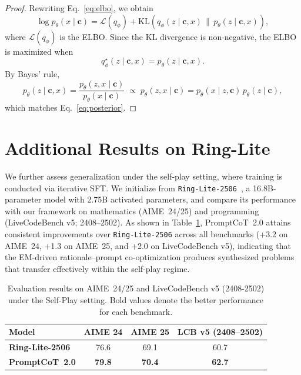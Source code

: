 \begin{proof}
Rewriting Eq.~\ref{eq:elbo}, we obtain
\[
\log p_\theta(x \mid \mathbf{c})
= \mathcal{L}(q_\phi) 
+ \mathrm{KL}\!\left(q_\phi(z \mid \mathbf{c}, x)\,\|\,p_\theta(z \mid \mathbf{c}, x)\right),
\]
where $\mathcal{L}(q_\phi)$ is the ELBO. Since the KL divergence is non-negative, the ELBO is maximized when
\[
q_\phi^\star(z \mid \mathbf{c}, x) = p_\theta(z \mid \mathbf{c}, x).
\]
By Bayes’ rule,
\[
p_\theta(z \mid \mathbf{c}, x) = \frac{p_\theta(z, x \mid \mathbf{c})}{p_\theta(x \mid \mathbf{c})}
\;\propto\; p_\theta(z, x \mid \mathbf{c})
= p_\theta(x \mid z, \mathbf{c}) \, p_\theta(z \mid \mathbf{c}),
\]
which matches Eq.~\ref{eq:posterior}.
\end{proof}


\section{Additional Results on Ring-Lite}
\label{sec:ringlite}

We further assess generalization under the self-play setting, where training is conducted via iterative SFT. We initialize from \texttt{Ring-Lite-2506}~\citep{team2025ring}, a 16.8B-parameter model with 2.75B activated parameters, and compare its performance with our framework on mathematics (AIME~24/25) and programming (LiveCodeBench v5; 2408–2502). As shown in Table~\ref{tab:ringlite}, PromptCoT~2.0 attains consistent improvements over \texttt{Ring-Lite-2506} across all benchmarks (+3.2 on AIME~24, +1.3 on AIME~25, and +2.0 on LiveCodeBench v5), indicating that the EM-driven rationale–prompt co-optimization produces synthesized problems that transfer effectively within the self-play regime.

\begin{table}[h]
\centering
\small
\begin{tabular}{lccc}
\toprule
\textbf{Model} & \textbf{AIME 24} & \textbf{AIME 25} & \textbf{LCB v5 (2408–2502)} \\
\midrule
\textbf{Ring-Lite-2506} & 76.6 & 69.1 & 60.7 \\
\textbf{PromptCoT~2.0} & \textbf{79.8} & \textbf{70.4} & \textbf{62.7} \\
\bottomrule
\end{tabular}
\caption{Evaluation results on AIME~24/25 and LiveCodeBench v5 (2408-2502) under the Self-Play setting. Bold values denote the better performance for each benchmark.}
\label{tab:ringlite}
\end{table}



